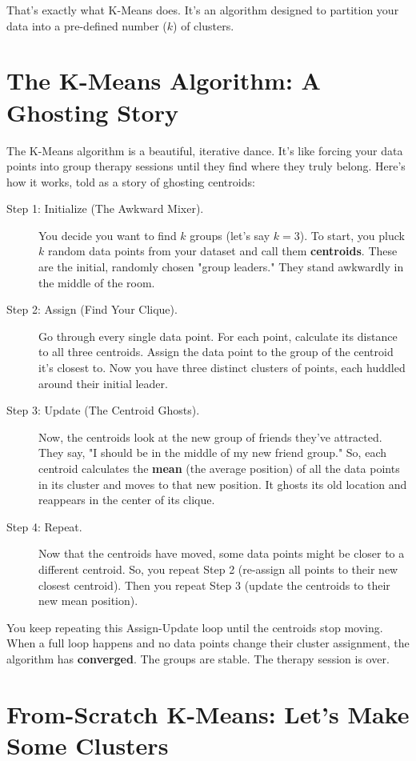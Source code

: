 \documentclass[11pt, letterpaper, openany]{book}
\begin{document}
That's exactly what K-Means does. It's an algorithm designed to partition your data into a pre-defined number ($k$) of clusters.

\section{The K-Means Algorithm: A Ghosting Story}

The K-Means algorithm is a beautiful, iterative dance. It's like forcing your data points into group therapy sessions until they find where they truly belong. Here's how it works, told as a story of ghosting centroids:
\begin{description}
    \item[Step 1: Initialize (The Awkward Mixer).] You decide you want to find $k$ groups (let's say $k=3$). To start, you pluck $k$ random data points from your dataset and call them \textbf{centroids}. These are the initial, randomly chosen "group leaders." They stand awkwardly in the middle of the room.
    \item[Step 2: Assign (Find Your Clique).] Go through every single data point. For each point, calculate its distance to all three centroids. Assign the data point to the group of the centroid it's closest to. Now you have three distinct clusters of points, each huddled around their initial leader.
    \item[Step 3: Update (The Centroid Ghosts).] Now, the centroids look at the new group of friends they've attracted. They say, "I should be in the middle of my new friend group." So, each centroid calculates the \textbf{mean} (the average position) of all the data points in its cluster and moves to that new position. It ghosts its old location and reappears in the center of its clique.
    \item[Step 4: Repeat.] Now that the centroids have moved, some data points might be closer to a different centroid. So, you repeat Step 2 (re-assign all points to their new closest centroid). Then you repeat Step 3 (update the centroids to their new mean position).
\end{description}
You keep repeating this Assign-Update loop until the centroids stop moving. When a full loop happens and no data points change their cluster assignment, the algorithm has \textbf{converged}. The groups are stable. The therapy session is over.

\section{From-Scratch K-Means: Let's Make Some Clusters}
\end{document}
